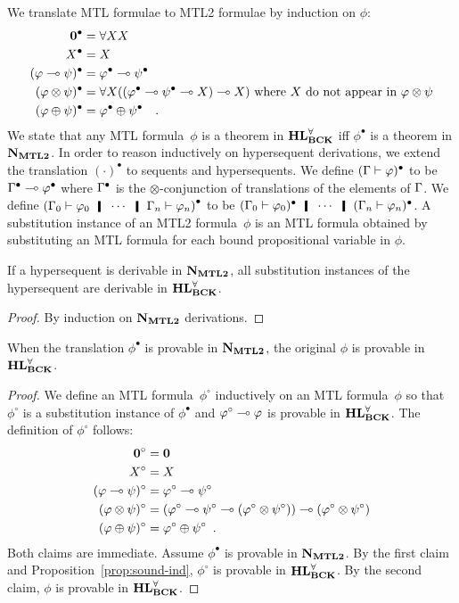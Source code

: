 We translate MTL formulae to MTL2 formulae by
induction on $\phi$:
\begin{align*}
 \mathbf{0}^\bullet &= \forall XX \nonumber\\
 X^\bullet &= X \nonumber\\
 (\varphi\multimap\psi)^\bullet &= \varphi^\bullet \multimap \psi^\bullet\nonumber\\
 (\varphi\otimes\psi)^\bullet & = \forall
 X((\varphi^\bullet\multimap\psi^\bullet\multimap X)\multimap X) \text{ where }X\text{ do
 not appear in }\varphi\otimes\psi\nonumber\\
 (\varphi\oplus\psi)^\bullet &= \varphi^\bullet \oplus \psi^\bullet\quad.
\end{align*}
We state that any MTL formula~$\phi$ is a theorem in $\mathbf{HL}^\forall_{\mathbf{BCK}}$ iff
 $\phi^\bullet$ is a theorem in $\mathbf{N}_{\mathbf{MTL2}}$.
 In order to reason inductively on hypersequent derivations, we extend
 the translation $(\cdot)^\bullet$ to sequents and hypersequents.
 We define $(\Gamma\vdash\varphi)^\bullet$ to be $\Gamma^\bullet\multimap\varphi^\bullet$
 where
 $\Gamma^\bullet$ is the $\otimes$-conjunction of translations of the
 elements of $\Gamma$.
 We define
 $\left(\G_0\tr\phi_0\hmid\cdots\hmid\G_n\tr\phi_n\right)^\bullet$ to be
 $(\G_0\tr\phi_0)^\bullet\hmid\cdots \hmid (\G_n\tr\phi_n)^\bullet$.
A substitution instance of an MTL2 formula~$\phi$ is an MTL formula obtained by
substituting an MTL formula for each bound propositional variable in $\phi$.
 \begin{proposition}
  \label{prop:sound-ind}
  If a hypersequent is derivable in $\mathbf{N}_{\mathbf{MTL2}}$, all substitution instances
  of the hypersequent are derivable in $\mathbf{HL}^\forall_{\mathbf{BCK}}$.
 \end{proposition}
  \begin{proof}
   By induction on $\mathbf{N}_{\mathbf{MTL2}}$ derivations.
  \end{proof}

 \begin{proposition}[Soundness]
  \label{prop:sound}
  When the translation $\phi^\bullet$ is provable in $\mathbf{N}_{\mathbf{MTL2}}$, the
  original $\phi$ is provable in $\mathbf{HL}^\forall_{\mathbf{BCK}}$.
 \end{proposition}
  \begin{proof}
   We define an MTL formula~$\phi^\circ$ inductively on an MTL
   formula~$\phi$ so that $\phi^\circ$ is a substitution instance of
   $\phi^\bullet$ and $\varphi^\circ\multimap\varphi$ is provable in
   $\mathbf{HL}^\forall_{\mathbf{BCK}}$.
   The definition of $\phi^\circ$ follows:
   \begin{align*}
    \mathbf 0^\circ&= \mathbf 0\\
    X^\circ &=X \\
    (\varphi\multimap\psi)^\circ&=\varphi^\circ\multimap\psi^\circ\\
    (\varphi\otimes\psi)^\circ &=
    (\varphi^\circ\multimap\psi^\circ\multimap(\varphi^\circ\otimes\psi^\circ))\multimap(\varphi^\circ\otimes\psi^\circ)\\
    (\varphi\oplus\psi)^\circ &= \varphi^\circ \oplus \psi^\circ\enspace.
   \end{align*}
   Both claims are immediate.  Assume $\phi^\bullet$
   is provable in $\mathbf{N}_{\mathbf{MTL2}}$.  By the first claim and Proposition~\ref{prop:sound-ind},
   $\phi^\circ$ is provable in $\mathbf{HL}^\forall_{\mathbf{BCK}}$.  By the second claim, $\phi$ is
   provable in $\mathbf{HL}^\forall_{\mathbf{BCK}}$.
  \end{proof}

